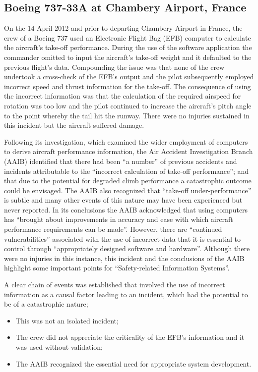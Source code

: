 \subsection{Boeing 737-33A at Chambery Airport, France} \label{bkm:incacc:737-33A} 
On the 14 April 2012 and prior to departing Chambery Airport in France, the crew of a Boeing 737 used an Electronic Flight Bag (EFB) computer to calculate the aircraft’s take-off performance. During the use of the software application the commander omitted to input the aircraft’s take-off weight and it defaulted to the previous flight’s data. Compounding the issue was that none of the crew undertook a cross-check of the EFB’s output and the pilot subsequently employed incorrect speed and thrust information for the take-off. The consequence of using the incorrect information was that the calculation of the required airspeed for rotation was too low and the pilot continued to increase the aircraft’s pitch angle to the point whereby the tail hit the runway. There were no injuries sustained in this incident but the aircraft suffered damage.

Following its investigation, which examined the wider employment of computers to derive aircraft performance information, the Air Accident Investigation Branch (AAIB) identified that there had been ``a number'' of previous accidents and incidents attributable to the ``incorrect calculation of take-off performance''; and that due to the potential for degraded climb performance a catastrophic outcome could be envisaged. The AAIB also recognized that ``take-off under-performance'' is subtle and many other events of this nature may have been experienced but never reported. In its conclusions the AAIB acknowledged that using computers has ``brought about improvements in \gls{accuracy} and ease with which aircraft performance requirements can be made''. However, there are ``continued vulnerabilities'' associated with the use of incorrect data that it is essential to control through ``appropriately designed software and hardware''. Although there were no injuries in this instance, this incident and the conclusions of the AAIB highlight some important points for ``Safety-related Information Systems''.

A clear chain of events was established that involved the use of incorrect information as a causal factor leading to an incident, which had the potential to be of a catastrophic nature;
\begin{itemize}
\item This was not an isolated incident;
\item The crew did not appreciate the \gls{criticality} of the EFB’s information and it was used without validation; 
\item The AAIB recognized the essential need for appropriate system development. 
\end{itemize}

